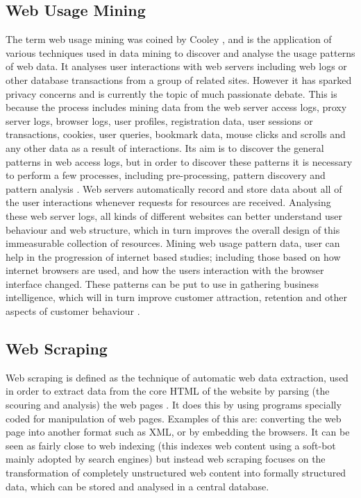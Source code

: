 \subsection{Web Usage Mining}

The term web usage mining was coined by Cooley \cite{mobasher2000automatic}, and is the application of various techniques used in data mining to discover and analyse the usage patterns of web data. It analyses user interactions with web servers including web logs or other database transactions from a group of related sites. However it has sparked privacy concerns and is currently the topic of much passionate debate. This is because the process includes mining data from the web server access logs, proxy server logs, browser logs, user profiles, registration data, user sessions or transactions, cookies, user queries, bookmark data, mouse clicks and scrolls and any other data as a result of interactions. Its aim is to discover the general patterns in web access logs, but in order to discover these patterns it is necessary to perform a few processes, including pre-processing, pattern discovery and pattern analysis \cite{wang2015design}. Web servers automatically record and store data about all of the user interactions whenever requests for resources are received. Analysing these web server logs, all kinds of different websites can better understand user behaviour and web structure, which in turn improves the overall design of this immeasurable collection of resources. Mining web usage pattern data, user can help in the progression of internet based studies; including those based on how internet browsers are used, and how the users interaction with the browser interface changed. These patterns can be put to use in gathering business intelligence, which will in turn improve customer attraction, retention and other aspects of customer behaviour \cite{claiborne2015self}.

\subsection{Web Scraping}

Web scraping is defined as the technique of automatic web data extraction, used in order to extract data from the core HTML of the website by parsing (the scouring and analysis) the web pages \cite{o2009web}. It does this by using programs specially coded for manipulation of web pages. Examples of this are: converting the web page into another format such as XML, or by embedding the browsers. It can be seen as fairly close to web indexing (this indexes web content using a soft-bot mainly adopted by search engines) but instead web scraping focuses on the transformation of completely unstructured web content into formally structured data, which can be stored and analysed in a central database. 

